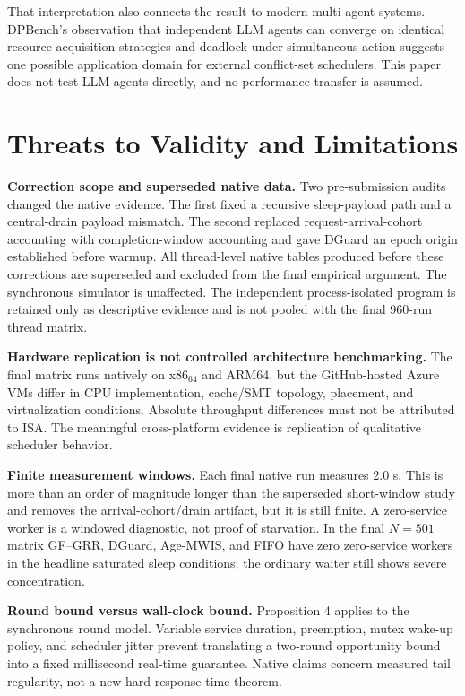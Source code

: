\documentclass[10pt,journal]{IEEEtran}
\begin{document}
That interpretation also connects the result to modern multi-agent systems. DPBench's observation that independent LLM agents can converge on identical resource-acquisition strategies and deadlock under simultaneous action \cite{hasan2026} suggests one possible application domain for external conflict-set schedulers. This paper does not test LLM agents directly, and no performance transfer is assumed.

\section{Threats to Validity and Limitations}
\textbf{Correction scope and superseded native data.} Two pre-submission audits changed the native evidence. The first fixed a recursive sleep-payload path and a central-drain payload mismatch. The second replaced request-arrival-cohort accounting with completion-window accounting and gave DGuard an epoch origin established before warmup. All thread-level native tables produced before these corrections are superseded and excluded from the final empirical argument. The synchronous simulator is unaffected. The independent process-isolated program is retained only as descriptive evidence and is not pooled with the final 960-run thread matrix.

\textbf{Hardware replication is not controlled architecture benchmarking.} The final matrix runs natively on x86$_{64}$ and ARM64, but the GitHub-hosted Azure VMs differ in CPU implementation, cache/SMT topology, placement, and virtualization conditions. Absolute throughput differences must not be attributed to ISA. The meaningful cross-platform evidence is replication of qualitative scheduler behavior.

\textbf{Finite measurement windows.} Each final native run measures 2.0 s. This is more than an order of magnitude longer than the superseded short-window study and removes the arrival-cohort/drain artifact, but it is still finite. A zero-service worker is a windowed diagnostic, not proof of starvation. In the final $N=501$ matrix GF--GRR, DGuard, Age-MWIS, and FIFO have zero zero-service workers in the headline saturated sleep conditions; the ordinary waiter still shows severe concentration.

\textbf{Round bound versus wall-clock bound.} Proposition 4 applies to the synchronous round model. Variable service duration, preemption, mutex wake-up policy, and scheduler jitter prevent translating a two-round opportunity bound into a fixed millisecond real-time guarantee. Native claims concern measured tail regularity, not a new hard response-time theorem.
\end{document}
